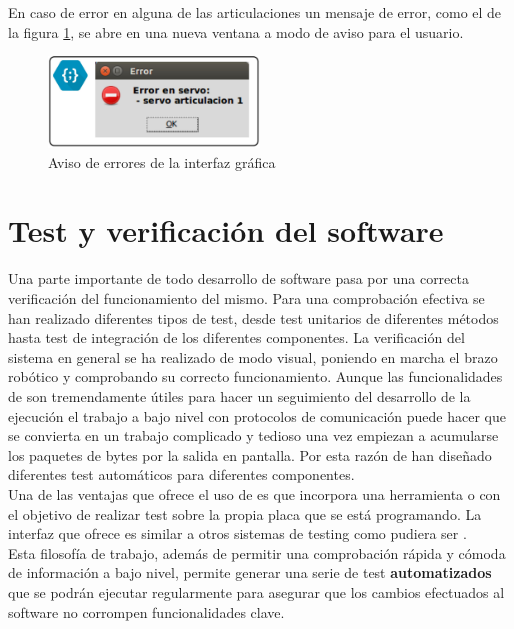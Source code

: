 	En caso de error en alguna de las articulaciones un mensaje de error, como el de la figura \ref{fig:SW:test:errorinterfaz}, se abre en una nueva ventana a modo de aviso para el usuario.
	
 \begin{figure}[H]
	  	\centering
	  	\includegraphics[width=0.5\textwidth]{figuras/Imagenes_SW/error_pynterface.jpg}
	  	\caption{Aviso de errores de la interfaz gráfica}
	  	\label{fig:SW:test:errorinterfaz}
 \end{figure}
\section{Test y verificación del software} \label{sec:SW:test}

    Una parte importante de todo desarrollo de software pasa por una correcta verificación del funcionamiento del mismo. Para una comprobación efectiva se han realizado diferentes tipos de test, desde test unitarios de diferentes métodos hasta test de integración de los diferentes componentes. La verificación del sistema en general se ha realizado de modo visual, poniendo en marcha el brazo robótico y comprobando su correcto funcionamiento. Aunque las funcionalidades de  son tremendamente útiles para hacer un seguimiento del desarrollo de la ejecución el trabajo a bajo nivel con protocolos de comunicación puede hacer que se convierta en un trabajo complicado y tedioso una vez empiezan a acumularse los paquetes de bytes por la salida en pantalla. Por esta razón de han diseñado diferentes test automáticos para diferentes componentes.
    \\
    
    Una de las ventajas que ofrece el uso de  es que incorpora una herramienta o  con el objetivo de realizar test sobre la propia placa que se está programando. La interfaz que ofrece es similar a otros sistemas de testing como pudiera ser .
    \\
    
    Esta filosofía de trabajo, además de permitir una comprobación rápida y cómoda de información a bajo nivel, permite generar una serie de test \textbf{automatizados} que se podrán ejecutar regularmente para asegurar que los cambios efectuados al software no corrompen funcionalidades clave.
    \\
    
